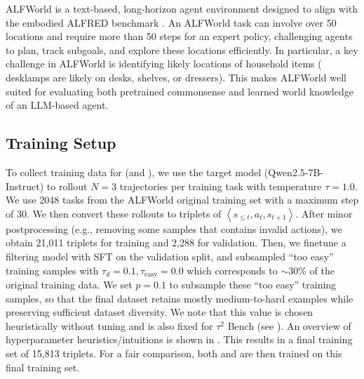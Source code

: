ALFWorld \citep{shridhar2021alfworldaligningtextembodied} is a text-based, long-horizon agent environment designed to align with the embodied ALFRED benchmark \citep{shridhar2021alfworldaligningtextembodied}.
An ALFWorld task can involve over 50 locations and require more than 50 steps for an expert policy, challenging agents to plan, track subgoals, and explore these locations efficiently.
In particular, a key challenge in ALFWorld is identifying likely locations of household items (\eg{} desklamps are likely on desks, shelves, or dressers). This makes ALFWorld well suited for evaluating both pretrained commonsense and learned world knowledge of an LLM-based agent.

\subsection{\wmrlshort{} Training Setup}
\label{subsec:alfworld_wmrl_setup}
To collect training data for \wmrlshort{} (and \wmsftshort{}), we use the target model (Qwen2.5-7B-Instruct) to rollout $N=3$ trajectories per training task with temperature $\tau=1.0$.
We use 2048 tasks from the ALFWorld original training set with a maximum step of 30.
We then convert these rollouts to triplets of $\left\langle s_{\le t}, a_t, s_{t+1} \right\rangle$.
After minor postprocessing (e.g., removing some samples that contains invalid actions), we obtain 21,011 triplets for training and 2,288 for validation.
Then, we finetune a filtering model with SFT on the validation split, and subsampled ``too easy'' training samples with $\tau_{d}=0.1,\tau_{\mathrm{easy}}=0.0$ which corresponds to $\sim$30\% of the original training data.
We set $p = 0.1$ to subsample these ``too easy'' training samples, so that the final dataset retains mostly medium-to-hard examples while preserving sufficient dataset diversity.
We note that this value is chosen heuristically without tuning and is also fixed for $\tau^2$ Bench (see ).
An overview of hyperparameter heuristics/intuitions is shown in .
This results in a final training set of 15,813 triplets.
For a fair comparison, both \wmrlshort{} and \wmsftshort{} are then trained on this final training set.

